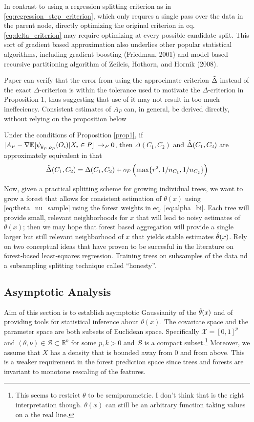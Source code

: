 In contrast to using a regression splitting criterion as in \ref{eq:regression_step_criterion}, which only requres a single pass over the data in the parent node, directly optimizing the original criterion in eq. \ref{eq:delta_criterion} may require optimizing at every possible candidate split. This sort of gradient based approximation also underlies other popular statistical algorithms, including gradient boosting (Friedman, 2001) and model based recursive partitioning algorithm of Zeileis, Hothorn, and Hornik (2008).

Paper can verify that the error from using the approcimate criterion $\tilde{\Delta}$ instead of the exact $\Delta$-criterion is within the tolerance used to motivate the $\Delta$-criterion in Proposition $1$, thus suggesting that use of it may not result in too much ineffeciency. Consistent estimates of $A_P$ can, in general, be derived directly, without relying on the proposition below
\begin{prop}
Under the conditions of Proposition \ref{prop1}, if $|A_P - \nabla\mathbb{E}[\psi_{\hat{\theta}_P, \hat{\nu}_P}(O_i)|X_i \in P]| \rightarrow_P 0$, then $\Delta(C_1, C_2)$ and $\tilde{\Delta}(C_1,C_2)$ are approximately equivalent in that 
\[\tilde{\Delta}(C_1,C_2) = \Delta(C_1,C_2) + o_P\left(\max\{r^2, 1/n_{C_1}, 1/n_{C_2}\}\right)\]
\end{prop}

Now, given a practical splitting scheme for growing individual trees, we want to grow a forest that allows for consistent estimation of $\theta(x)$ using \ref{eq:theta_nu_sample} using the forest weights in eq. \ref{eq:alpha_bi}. Each tree will provide small, relevant neighborhoods for $x$ that will lead to noisy estimates of $\theta(x)$; then we may hope that forest based aggregation will provide a single larger but still relevant neighborhood of $x$ that yields stable estimates $\hat{\theta}(x)$. Rely on two conceptual ideas that have proven to be succesful in the literature on forest-based least-squares regression. 
Training trees on subsamples of the data nd a subsampling splitting technique called ``honesty''.

\subsection{Asymptotic Analysis}

Aim of this section is to establish asymptotic Gaussianity of the $\hat{\theta}(x)$ and of providing tools for statistical inference about $\theta(x)$. The covariate space and the parameter space are both subsets of Euclidean space. Specifically $\mathscr{X} = [0,1]^p$ and $(\theta, \nu) \in \mathscr{B} \subset \mathbb{R}^k$ for some $p,k > 0$ and $\mathscr{B}$ is a compact subset.\footnote{This seems to restrict $\theta$ to be semiparametric. I don't think that is the right interpretation though. $\theta(x)$ can still be an arbitrary function taking values on a the real line.} Moreover, we assume that $X$ has a density that is bounded away from 0 and from above. This is a weaker requirement in the forest prediction space since trees and forests are invariant to monotone rescaling of the features.

